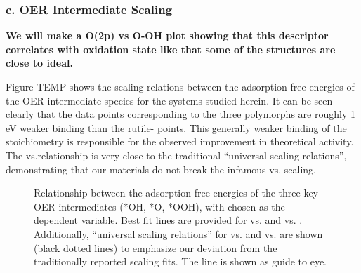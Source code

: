 

\subsubsection{c. OER Intermediate Scaling}
{\bf We will make a O(2p) vs O-OH plot showing that this descriptor correlates with oxidation state like that some of the structures are close to ideal.}

Figure TEMP shows the scaling relations between the adsorption free energies of the OER intermediate species for the \IrOx systems studied herein.
%
It can be seen clearly that the data points corresponding to the three  polymorphs are roughly 1 eV weaker binding than the rutile- points.
%
This generally weaker binding of the  stoichiometry is responsible for the observed improvement in theoretical activity.
%
The \DGOOH vs.\DGOH relationship is very close to the traditional ``universal scaling relations'', demonstrating that our materials do not break the infamous \DGOOH vs. \DGOH scaling.


\begin{figure}
\centering
{}
\caption{\label{fig:scaling_relations}
Relationship between the adsorption free energies of the three key OER intermediates (*OH, *O, *OOH), with \DGOH chosen as the dependent variable.
Best fit lines are provided for \DGOOH vs. \DGOH and \DGO vs. \DGOH.
%
Additionally, ``universal scaling relations'' for \DGOOH vs. \DGOH and \DGO vs. \DGOH are shown (black dotted lines) to emphasize our deviation from the traditionally reported scaling fits.
The \DGOH line is  shown as guide to eye.
}
\end{figure}

